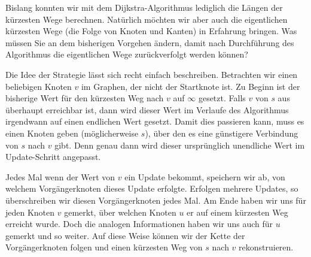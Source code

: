 \begin{myexercise}\label{aufgabe:206}
Bislang konnten wir mit dem Dijkstra-Algorithmus lediglich die Längen der kürzesten Wege berechnen. Natürlich möchten wir aber auch die eigentlichen kürzesten Wege (die Folge von Knoten und Kanten) in Erfahrung bringen. Was müssen Sie an dem bisherigen Vorgehen ändern, damit nach Durchführung des Algorithmus die eigentlichen Wege zurückverfolgt werden können?
\begin{myanswer}\label{aufgabe:206-sol}
Die Idee der Strategie lässt sich recht einfach beschreiben. Betrachten wir einen beliebigen Knoten $v$ im Graphen, der nicht der Startknote ist. Zu Beginn ist der bisherige Wert für den kürzesten Weg nach $v$ auf $\infty$ gesetzt. Falls $v$ von $s$ aus überhaupt erreichbar ist, dann wird dieser Wert im Verlaufe des Algorithmus irgendwann auf einen endlichen Wert gesetzt. Damit dies passieren kann, muss es einen Knoten geben (möglicherweise $s$), über den es eine günstigere Verbindung von $s$ nach $v$ gibt. Denn genau dann wird dieser ursprünglich unendliche Wert im Update-Schritt angepasst. 

Jedes Mal wenn der Wert von $v$ ein Update bekommt, speichern wir ab, von welchem Vorgängerknoten dieses Update erfolgte. Erfolgen mehrere Updates, so überschreiben wir diesen Vorgängerknoten jedes Mal. Am Ende haben wir uns für jeden Knoten $v$ gemerkt, über welchen Knoten $u$ er auf einem kürzesten Weg erreicht wurde. Doch die analogen Informationen haben wir uns auch für $u$ gemerkt und so weiter. Auf diese Weise können wir der Kette der Vorgängerknoten folgen und einen kürzesten Weg von $s$ nach $v$ rekonstruieren.
\end{myanswer}
\end{myexercise}

